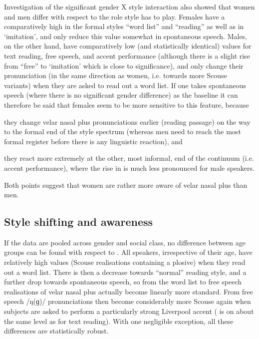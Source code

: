 Investigation of the significant gender X style interaction also showed that women and men differ with respect to the role style has to play.
Females have a comparatively high  in the formal styles ``word list'' and ``reading'' as well as in `imitation', and only reduce this value somewhat in spontaneous speech.
Males, on the other hand, have comparatively low (and statistically identical) values for text reading, free speech, and accent performance (although there is a slight rise from ``free'' to `imitation' which is close to significance), and only change their pronunciation (in the same direction as women, i.e. towards more Scouse variants) when they are asked to read out a word list.
If one takes spontaneous speech (where there is no significant gender difference) as the baseline it can therefore be said that females seem to be more sensitive to this feature, because
\begin{inparaenum}[(a)]
	\item they change velar nasal plus pronunciations earlier (reading passage) on the way to the formal end of the style spectrum (whereas men need to reach the most formal register before there is any linguistic reaction), and
	\item they react more extremely at the other, most informal, end of the continuum (i.e. accent performance), where the rise in  is much less pronounced for male speakers.
\end{inparaenum}
Both points suggest that women are rather more aware of velar nasal plus than men.

\subsection{Style shifting and awareness}
\label{prod.disc.ng.style}

If the data are pooled across gender and social class, no difference between age groups can be found with respect to .
All speakers, irrespective of their age, have relatively high  values (Scouse realisations containing a plosive) when they read out a word list.
There is then a decrease towards ``normal'' reading style, and a further drop towards spontaneous speech, so from the word list to free speech realisations of velar nasal plus actually become linearly more standard.
From free speech /ŋ(ɡ)/ pronunciations then become considerably more Scouse again when subjects are asked to perform a particularly strong Liverpool accent ( is on about the same level as for text reading).
With one negligible exception, all these differences are statistically robust.

